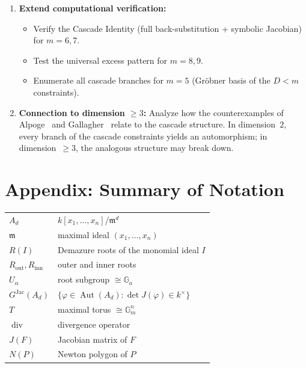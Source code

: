 \documentclass[12pt,a4paper]{article}
\theoremstyle{definition}
\newcommand{\kk}{k}
\newcommand{\pp}{\mathfrak{m}}
\newcommand{\Aut}{\operatorname{Aut}}
\newcommand{\GJac}{G^{\mathrm{Jac}}}
\newcommand{\divop}{\operatorname{div}}
\newcommand{\Ga}{\mathbb{G}_a}
\newcommand{\Gm}{\mathbb{G}_m}
\begin{document}
\begin{enumerate}
\item \textbf{Extend computational verification:}
  \begin{itemize}
  \item Verify the Cascade Identity (full back-substitution
    + symbolic Jacobian) for $m = 6, 7$.
  \item Test the universal excess pattern for $m = 8, 9$.
  \item Enumerate all cascade branches for $m = 5$
    (Gr\"obner basis of the $D < m$ constraints).
  \end{itemize}

\item \textbf{Connection to dimension $\geq 3$:} Analyze how the
  counterexamples of Alpoge~\cite{Alpoge2026} and
  Gallagher~\cite{Gallagher2026} relate to the cascade structure.
  In dimension~$2$, every branch of the cascade constraints yields
  an automorphism; in dimension~$\geq 3$, the analogous
  structure may break down.
\end{enumerate}

\section{Appendix: Summary of Notation}

\begin{center}
\begin{tabular}{ll}
\hline
$A_d$ & $\kk[x_1,\ldots,x_n]/\pp^d$ \\
$\pp$ & maximal ideal $(x_1,\ldots,x_n)$ \\
$R(I)$ & Demazure roots of the monomial ideal $I$ \\
$R_{\mathrm{out}}, R_{\mathrm{inn}}$ & outer and inner roots \\
$U_\alpha$ & root subgroup $\cong \Ga$ \\
$\GJac(A_d)$ & $\{\varphi \in \Aut(A_d) : \det J(\varphi) \in \kk^\times\}$ \\
$T$ & maximal torus $\cong \Gm^n$ \\
$\divop$ & divergence operator \\
$J(F)$ & Jacobian matrix of $F$ \\
$N(P)$ & Newton polygon of $P$ \\
\hline
\end{tabular}
\end{center}
\end{document}
